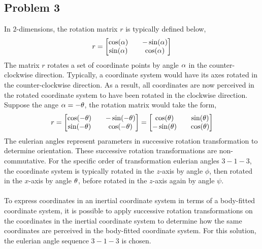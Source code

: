 \documentclass[class=report, 12pt, crop=false]{standalone}
\begin{document}
\begin{center}

\section{Problem 3}
\begin{comment}
\end{comment}
In $2$-dimensions, the rotation matrix $r$ is typically defined below,
$$r = \begin{bmatrix}
\cos(\alpha) && -\sin(\alpha) \\ 
\sin(\alpha) && \cos(\alpha)
\end{bmatrix}$$
The matrix $r$ rotates a set of coordinate points by angle $\alpha$ in the counter-clockwise direction. Typically, a coordinate system would have its axes rotated in the counter-clockwise direction. As a result, all coordinates are now perceived in the rotated coordinate system to have been rotated in the clockwise direction. Suppose the ange $\alpha = -\theta$, the rotation matrix would take the form,
$$r = \begin{bmatrix}
\cos(-\theta) && -\sin(-\theta) \\ 
\sin(-\theta) && \cos(-\theta)
\end{bmatrix} = \begin{bmatrix}
\cos(\theta) && \sin(\theta) \\ 
-\sin(\theta) && \cos(\theta)
\end{bmatrix}$$
The eulerian angles represent parameters in successive rotation transformation to determine orientation. These successive rotation transformations are non-commutative. For the specific order of transformation eulerian angles $3-1-3$, the coordinate system is typically rotated in the $z$-axis by angle $\phi$, then rotated in the $x$-axis by angle $\theta$, before rotated in the $z$-axis again by angle $\psi$. 
\\~\\To express coordinates in an inertial coordinate system in terms of a body-fitted coordinate system, it is possible to apply successive rotation transformations on the coordinates in the inertial coordinate system to determine how the same coordinates are perceived in the body-fitted coordinate system. For this solution, the eulerian angle sequence $3-1-3$ is chosen. 


\end{center}
\end{document}
